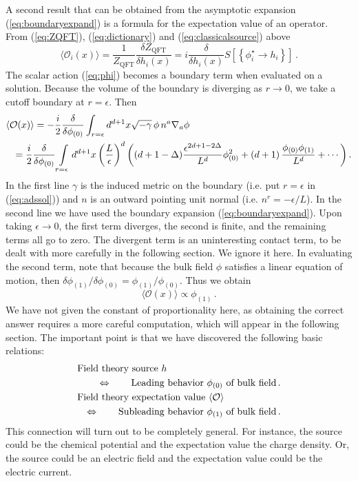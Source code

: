 \documentclass[10pt, oneside]{book}
\def\be{\begin{equation}}
\def\ee{\end{equation}}
\newcommand{\bea}{\begin{eqnarray}}
\newcommand{\eea}{\end{eqnarray}}
\def\ocal{{\mathcal{O}}}
\begin{document}
\begin{doublespace}
A second result that can be obtained from the asymptotic expansion (\ref{eq:boundaryexpand}) is a formula for the expectation value of an operator. From (\ref{eq:ZQFT}), (\ref{eq:dictionary}) and (\ref{eq:classicalsource}) above
\be
\langle \ocal_i(x) \rangle = \frac{1}{Z_\text{QFT}} \frac{\delta Z_\text{QFT}}{\delta h_i(x)} =
i \frac{\delta}{\delta h_i(x)} S\left[\left\{\phi^\star_i \to h_i \right\}\right] \,.
\ee
The scalar action (\ref{eq:phi}) becomes a boundary term when evaluated on a solution. Because the volume of the boundary is diverging as $r \to 0$, we take a cutoff boundary at $r= \epsilon$. Then
\bea
\lefteqn{\langle \ocal(x) \rangle  =  - \frac{i}{2} \frac{\delta}{\delta \phi_{(0)}} \int_{r=\epsilon} d^{d+1}x \sqrt{-\gamma} \, \phi \, n^a \nabla_a \phi} \\
& & =  \frac{i}{2} \frac{\delta}{\delta \phi_{(0)}} \int\limits_{r=\epsilon} d^{d+1}x \left(\frac{L}{\epsilon}\right)^d \left((d+1-\Delta) \frac{\epsilon^{2d+1-2\Delta}}{L^d} \phi_{(0)}^2 + (d+1) \, \frac{\phi_{(0)} \phi_{(1)}}{L^d} + \cdots \right). \label{eq:diverge}  
\eea
In the first line $\gamma$ is the induced metric on the boundary (i.e. put $r= \epsilon$ in (\ref{eq:adssol})) and $n$ is an outward pointing unit normal (i.e. $n^r = - \epsilon/L$). In the second line we have used the boundary expansion (\ref{eq:boundaryexpand}). Upon taking $\epsilon \to 0$, the first term diverges, the second is finite, and the remaining terms all go to zero. The divergent term is an uninteresting contact term, to be dealt with more carefully in the following section. We ignore it here. In evaluating the second term, note that because the bulk field $\phi$ satisfies a linear equation of motion, then $\delta \phi_{(1)}/\delta \phi_{(0)} = \phi_{(1)}/\phi_{(0)}$. Thus we obtain
\be\label{eq:vev}
\langle \ocal(x) \rangle \propto \phi_{(1)} \,.
\ee
We have not given the constant of proportionality here, as obtaining the correct answer requires a more careful computation, which will appear in the following section. The important point is that we have discovered the following basic relations:
\bea
\lefteqn{\text{Field theory source $h$}} \nonumber \\
 & & \Leftrightarrow \qquad \text{Leading behavior $\phi_{(0)}$ of bulk field} \,. \\
\lefteqn{\text{Field theory expectation value $\langle \ocal \rangle$}} \nonumber \\
 &  & \Leftrightarrow \qquad \text{Subleading behavior $\phi_{(1)}$ of bulk field}  \,. \label{eq:subl}
\eea
This connection will turn out to be completely general. For instance, the source could be the chemical potential and the expectation value the charge density. Or, the source could be an electric field and the expectation value could be the electric current.


\end{doublespace}
\end{document}
